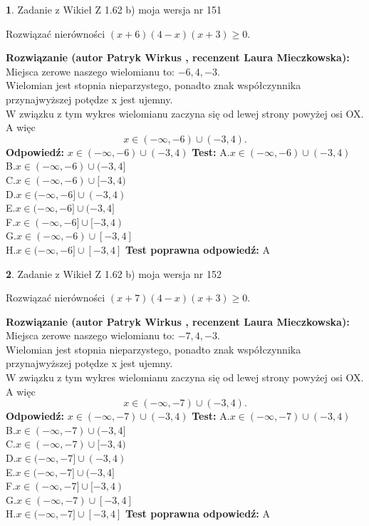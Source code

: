 \documentclass[12pt, a4paper]{article}
\theoremstyle{definition} %
\newtheorem{zad}{}
\newcommand{\zadStart}[1]{\begin{zad}#1\newline}
\newcommand{\zadStop}{\end{zad}}
\newcommand{\rozwStart}[2]{\noindent \textbf{Rozwiązanie (autor #1 , recenzent #2): }\newline}
\newcommand{\rozwStop}{\newline}
\newcommand{\odpStart}{\noindent \textbf{Odpowiedź:}\newline}
\newcommand{\odpStop}{\newline}
\newcommand{\testStart}{\noindent \textbf{Test:}\newline}
\newcommand{\testStop}{\newline}
\newcommand{\kluczStart}{\noindent \textbf{Test poprawna odpowiedź:}\newline}
\newcommand{\kluczStop}{\newline}
\begin{document}
\zadStart{Zadanie z Wikieł Z 1.62 b) moja wersja nr 151}

Rozwiązać nierówności $(x+6)(4-x)(x+3)\ge0$.
\zadStop
\rozwStart{Patryk Wirkus}{Laura Mieczkowska}
Miejsca zerowe naszego wielomianu to: $-6, 4, -3$.\\
Wielomian jest stopnia nieparzystego, ponadto znak współczynnika przy\linebreak najwyższej potędze x jest ujemny.\\ W związku z tym wykres wielomianu zaczyna się od lewej strony powyżej osi OX. A więc $$x \in (-\infty,-6) \cup (-3,4).$$
\rozwStop
\odpStart
$x \in (-\infty,-6) \cup (-3,4)$
\odpStop
\testStart
A.$x \in (-\infty,-6) \cup (-3,4)$\\
B.$x \in (-\infty,-6) \cup (-3,4]$\\
C.$x \in (-\infty,-6) \cup [-3,4)$\\
D.$x \in (-\infty,-6] \cup (-3,4)$\\
E.$x \in (-\infty,-6] \cup (-3,4]$\\
F.$x \in (-\infty,-6] \cup [-3,4)$\\
G.$x \in (-\infty,-6) \cup [-3,4]$\\
H.$x \in (-\infty,-6] \cup [-3,4]$
\testStop
\kluczStart
A
\kluczStop



\zadStart{Zadanie z Wikieł Z 1.62 b) moja wersja nr 152}

Rozwiązać nierówności $(x+7)(4-x)(x+3)\ge0$.
\zadStop
\rozwStart{Patryk Wirkus}{Laura Mieczkowska}
Miejsca zerowe naszego wielomianu to: $-7, 4, -3$.\\
Wielomian jest stopnia nieparzystego, ponadto znak współczynnika przy\linebreak najwyższej potędze x jest ujemny.\\ W związku z tym wykres wielomianu zaczyna się od lewej strony powyżej osi OX. A więc $$x \in (-\infty,-7) \cup (-3,4).$$
\rozwStop
\odpStart
$x \in (-\infty,-7) \cup (-3,4)$
\odpStop
\testStart
A.$x \in (-\infty,-7) \cup (-3,4)$\\
B.$x \in (-\infty,-7) \cup (-3,4]$\\
C.$x \in (-\infty,-7) \cup [-3,4)$\\
D.$x \in (-\infty,-7] \cup (-3,4)$\\
E.$x \in (-\infty,-7] \cup (-3,4]$\\
F.$x \in (-\infty,-7] \cup [-3,4)$\\
G.$x \in (-\infty,-7) \cup [-3,4]$\\
H.$x \in (-\infty,-7] \cup [-3,4]$
\testStop
\kluczStart
A
\kluczStop
\end{document}
